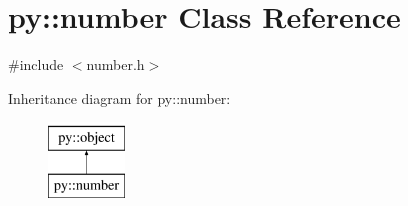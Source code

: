 \hypertarget{classpy_1_1number}{}\section{py\+:\+:number Class Reference}
\label{classpy_1_1number}


{\ttfamily \#include $<$number.\+h$>$}

Inheritance diagram for py\+:\+:number\+:\begin{figure}[H]
\begin{center}
\leavevmode
\includegraphics[height=2.000000cm]{classpy_1_1number}
\end{center}
\end{figure}
